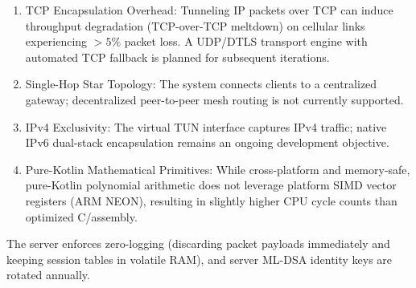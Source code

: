 \begin{enumerate}
    \item TCP Encapsulation Overhead: Tunneling IP packets over TCP can induce throughput degradation (TCP-over-TCP meltdown) on cellular links experiencing $> 5\%$ packet loss. A UDP/DTLS transport engine with automated TCP fallback is planned for subsequent iterations.
    \item Single-Hop Star Topology: The system connects clients to a centralized gateway; decentralized peer-to-peer mesh routing is not currently supported.
    \item IPv4 Exclusivity: The virtual TUN interface captures IPv4 traffic; native IPv6 dual-stack encapsulation remains an ongoing development objective.
    \item Pure-Kotlin Mathematical Primitives: While cross-platform and memory-safe, pure-Kotlin polynomial arithmetic does not leverage platform SIMD vector registers (ARM NEON), resulting in slightly higher CPU cycle counts than optimized C/assembly.
\end{enumerate}

The server enforces zero-logging (discarding packet payloads immediately and keeping session tables in volatile RAM), and server ML-DSA identity keys are rotated annually.
